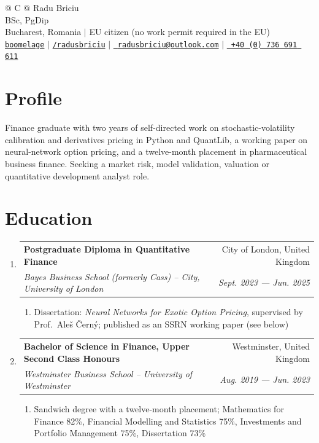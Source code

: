 \documentclass[a4paper,11pt]{article}
\makeatletter
\newcommand{\resumeItem}[1]{
	\item\small{
		{\fontsize{10}{0}\selectfont #1 \par}
	}
}
\newcommand{\resumeSubheading}[4]{
	\vspace{-2pt}\item
		\begin{tabular*}{0.97\textwidth}[t]{l@{\extracolsep{\fill}}r}
			\textbf{#1} & #2 \\
			\textit{\small#3} & \textit{\small #4} \\
		\end{tabular*}\vspace{-7pt}
}
\newcommand{\resumeSubHeadingListStart}{\begin{enumerate}[leftmargin=0.15in, label={}]}
\newcommand{\resumeSubHeadingListEnd}{\end{enumerate}}
\newcommand{\resumeItemListStart}{\begin{enumerate} }
\newcommand{\resumeItemListEnd}{\end{enumerate}\vspace{-5pt}}
\makeatother
\begin{document}
	\vfill
	\begin{tabularx}{\linewidth}{@{} C @{}}
		\Huge{Radu Briciu} \\ \small{BSc,  PgDip} \\[4pt]
		\small{Bucharest, Romania $|$ EU citizen (no work permit required in the EU)} \\[4pt]
		\href{https://github.com/boomelage}{\raisebox{-0.05\height}\faGit \! \texttt{boomelage}} $|$
		\href{https://linkedin.com/in/radusbriciu}{\raisebox{-0.05\height}\faLinkedinIn \texttt{/radusbriciu}}  $|$
		\href{mailto:radusbriciu@outlook.com}{\raisebox{-0.05\height}\faInbox \ \texttt{radusbriciu@outlook.com}}  $|$
		\href{tel:+40736691611}{\raisebox{-0.05\height}\faPhone \ \texttt{+40 (0) 736 691 611}} \\
	\end{tabularx}
	\vfill

	\section{Profile}
		\begin{itemize}[leftmargin=0.15in, label={}]
			\small{\item{
				Finance graduate with two years of self-directed work on stochastic-volatility calibration and derivatives pricing in Python and QuantLib, 
				a working paper on neural-network option pricing, and a twelve-month placement in pharmaceutical business finance. Seeking a market risk, model validation, 
				valuation or quantitative development analyst role.
			}}
		\end{itemize}
		\vfill

	\section{Education}
		\resumeSubHeadingListStart
			\resumeSubheading
				{Postgraduate Diploma in Quantitative Finance}{City  of London, United Kingdom}
				{\fontsize{9.4}{11}\selectfont Bayes Business School (formerly Cass) -- City, University of London}{Sept. 2023 --- Jun. 2025}
				\resumeItemListStart
					\resumeItem{Dissertation: \textit{Neural Networks for Exotic Option Pricing}, supervised by Prof.\ Ale\v{s} \v{C}ern\'y; published as an SSRN working paper (see below)}
				\resumeItemListEnd
			\resumeSubheading
				{Bachelor of Science in Finance, Upper Second Class Honours}{Westminster, United Kingdom}
				{\fontsize{9.4}{11}\selectfont Westminster Business School -- University of Westminster}{Aug. 2019 --- Jun. 2023}
				\resumeItemListStart
					\resumeItem{Sandwich degree with a twelve-month placement; Mathematics for Finance 82\%, Financial Modelling and Statistics 75\%, Investments and Portfolio Management 75\%, Dissertation 73\%}
				\resumeItemListEnd
		\resumeSubHeadingListEnd
		\vfill
\end{document}
